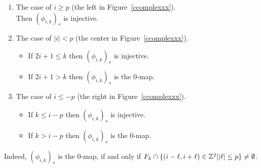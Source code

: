 \documentclass[11pt]{amsart}
\begin{document}
\begin{enumerate}
\item The case of $i\ge p$ (the left in {\sc Figure}~\ref{ccomplexxx}).\\
Then $(\phi_{i,k})_\ast$ is injective.
\item The case of $|i|<p$ (the center in {\sc Figure}~\ref{ccomplexxx}).
\begin{itemize}
\item If $2i+1\le k$ then $(\phi_{i,k})_\ast$ is injective.
\item If $2i+1> k$ then $(\phi_{i,k})_\ast$ is the $0$-map.
\end{itemize}
\item The case of $i\le -p$ (the right in {\sc Figure}~\ref{ccomplexxx}).
\begin{itemize}
\item If $k\le i-p$ then $(\phi_{i,k})_\ast$ is injective.
\item If $k> i-p$ then $(\phi_{i,k})_\ast$ is the $0$-map.
\end{itemize}
\end{enumerate}
Indeed, $(\phi_{i,k})_\ast$ is the $0$-map, if and only if $F_k\cap \{(i-\ell,i+\ell)\in {\Bbb Z}^2||\ell|\le p\}\neq \emptyset$.
\end{document}
